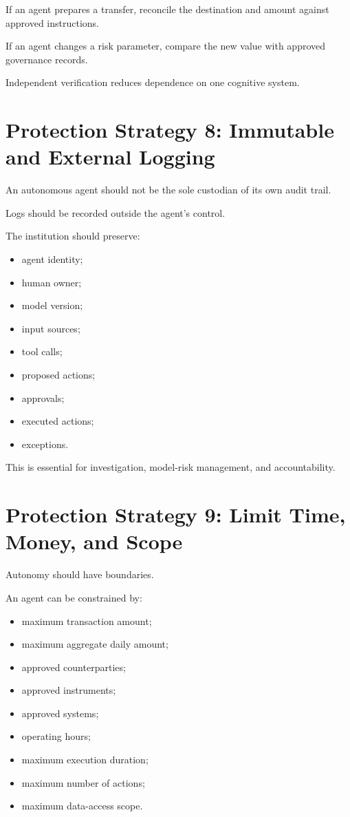 If an agent prepares a transfer, reconcile the destination and amount against approved instructions.

If an agent changes a risk parameter, compare the new value with approved governance records.

Independent verification reduces dependence on one cognitive system.

\section{Protection Strategy 8: Immutable and External Logging}

An autonomous agent should not be the sole custodian of its own audit trail.

Logs should be recorded outside the agent's control.

The institution should preserve:

\begin{itemize}
    \item agent identity;
    \item human owner;
    \item model version;
    \item input sources;
    \item tool calls;
    \item proposed actions;
    \item approvals;
    \item executed actions;
    \item exceptions.
\end{itemize}

This is essential for investigation, model-risk management, and accountability.

\section{Protection Strategy 9: Limit Time, Money, and Scope}

Autonomy should have boundaries.

An agent can be constrained by:

\begin{itemize}
    \item maximum transaction amount;
    \item maximum aggregate daily amount;
    \item approved counterparties;
    \item approved instruments;
    \item approved systems;
    \item operating hours;
    \item maximum execution duration;
    \item maximum number of actions;
    \item maximum data-access scope.
\end{itemize}

